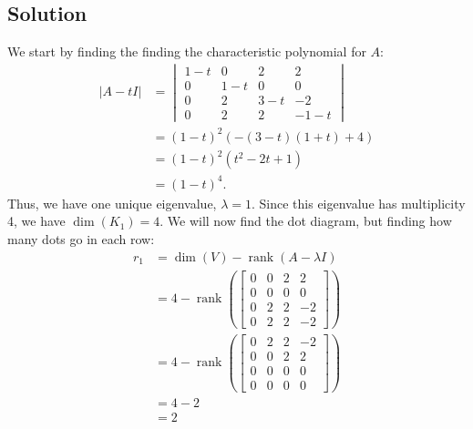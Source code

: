 \documentclass[10pt,a4paper]{article}
\theoremstyle{definition}
\DeclareMathOperator\rank{rank}
\begin{document}
\subsection*{Solution}
We start by finding the finding the characteristic polynomial for $A$:
\begin{align*}
|A - t I| &= \begin{vmatrix}
1 - t &0 &2 &2\\
0 &1 - t &0 &0\\
0 &2 &3 - t &-2\\
0 &2 &2 &-1 - t
\end{vmatrix}\\
&= (1 - t)^2 (-(3-t)(1+t) + 4)\\
&= (1 - t)^2(t^2 - 2t + 1)\\
&= (1-t)^4.
\end{align*}
Thus, we have one unique eigenvalue, $\lambda = 1$. Since this eigenvalue has multiplicity 4, we have $\dim (K_1) = 4$. We will now find the dot diagram, but finding how many dots go in each row:
\begin{align*}
r_1 &= \dim(V) - \rank (A - \lambda I)\\
&= 4 - \rank \left( \begin{bmatrix}
0 &0 &2 &2\\
0 &0 &0 &0\\
0 &2 &2 &-2\\
0 &2 &2 &-2
\end{bmatrix} \right)\\
&= 4 - \rank \left( \begin{bmatrix}
0 &2 &2 &-2\\
0 &0 &2 &2\\
0 &0 &0 & 0\\
0 &0 &0 & 0
\end{bmatrix} \right)\\
&= 4 - 2\\
&= 2
\end{align*}
\end{document}
